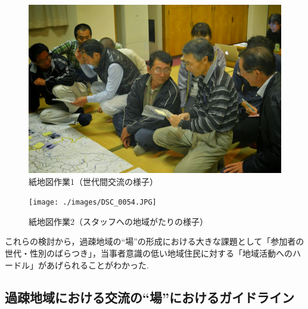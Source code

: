 \documentclass[a4paper]{jsarticle}
\begin{document}
\begin{enumerate}
\begin{figure}[H]
  \begin{center}
    \includegraphics[width=0.8\hsize]{./images/komenoma-2.png}
    \caption{紙地図作業1（世代間交流の様子）}
    \label{fig:tmu_hino}
  \end{center}
\end{figure}
\begin{figure}[H]
  \begin{center}
    \texttt{[image: ./images/DSC\_0054.JPG]}
    \caption{紙地図作業2（スタッフへの地域がたりの様子）}
    \label{fig:tmu_hino}
  \end{center}
\end{figure}

\end{enumerate}
これらの検討から，過疎地域の“場”の形成における大きな課題として「参加者の世代・性別のばらつき」，当事者意識の低い地域住民に対する「地域活動へのハードル」があげられることがわかった.



\subsection{過疎地域における交流の“場”におけるガイドライン}
\end{document}
